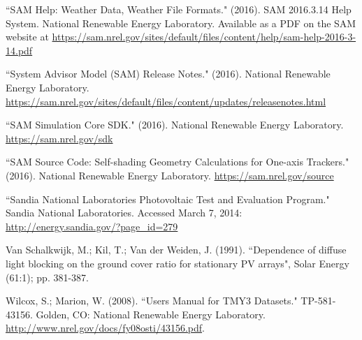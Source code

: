 \documentclass[12pt,letterpaper]{article}
\begin{document}
\begin{thebibliography}{99}
 ``SAM Help: Weather Data, Weather File Formats." (2016). SAM 2016.3.14 Help System. National Renewable Energy Laboratory. Available as a PDF on the SAM website at \url{https://sam.nrel.gov/sites/default/files/content/help/sam-help-2016-3-14.pdf}

 ``System Advisor Model (SAM) Release Notes." (2016). National Renewable Energy Laboratory. \url{https://sam.nrel.gov/sites/default/files/content/updates/releasenotes.html}

 ``SAM Simulation Core SDK." (2016). National Renewable Energy Laboratory. \url{https://sam.nrel.gov/sdk}

 ``SAM Source Code: Self-shading Geometry Calculations for One-axis Trackers." (2016). National Renewable Energy Laboratory. \url{https://sam.nrel.gov/source}

 ``Sandia National Laboratories Photovoltaic Test and Evaluation Program." Sandia National Laboratories. Accessed March 7, 2014: \url{http://energy.sandia.gov/?page_id=279}

 Van Schalkwijk, M.; Kil, T.; Van der Weiden, J. (1991). ``Dependence of diffuse light blocking on the ground cover ratio for stationary PV arrays", Solar Energy (61:1); pp. 381-387.

 Wilcox, S.; Marion, W. (2008). ``Users Manual for TMY3 Datasets." TP-581-43156. Golden, CO: National Renewable Energy Laboratory. \url{http://www.nrel.gov/docs/fy08osti/43156.pdf}.

\end{thebibliography}
\end{document}
